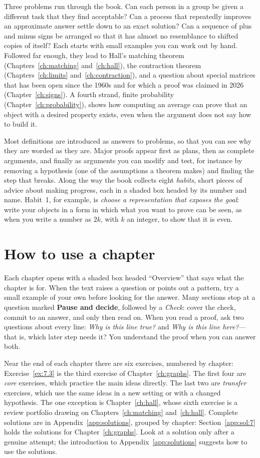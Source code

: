 Three problems run through the book. Can each person in a group be given a different task that they find acceptable? Can a process that repeatedly improves an approximate answer settle down to an exact solution? Can a sequence of plus and minus signs be arranged so that it has almost no resemblance to shifted copies of itself? Each starts with small examples you can work out by hand. Followed far enough, they lead to Hall's matching theorem (Chapters~\ref{ch:matching} and~\ref{ch:hall}), the contraction theorem (Chapters~\ref{ch:limits} and~\ref{ch:contraction}), and a question about special matrices that has been open since the 1960s and for which a proof was claimed in 2026 (Chapter~\ref{ch:signs}). A fourth strand, finite probability (Chapter~\ref{ch:probability}), shows how computing an average can prove that an object with a desired property exists, even when the argument does not say how to build it.

Most definitions are introduced as answers to problems, so that you can see why they are worded as they are. Major proofs appear first as plans, then as complete arguments, and finally as arguments you can modify and test, for instance by removing a hypothesis (one of the assumptions a theorem makes) and finding the step that breaks. Along the way the book collects eight \emph{habits}, short pieces of advice about making progress, each in a shaded box headed by its number and name. Habit~1, for example, is \emph{choose a representation that exposes the goal}: write your objects in a form in which what you want to prove can be seen, as when you write a number as $2k$, with $k$ an integer, to show that it is even.

\section*{How to use a chapter}
Each chapter opens with a shaded box headed ``Overview'' that says what the chapter is for. When the text raises a question or points out a pattern, try a small example of your own before looking for the answer. Many sections stop at a question marked \textbf{Pause and decide}, followed by a \textit{Check}: cover the check, commit to an answer, and only then read on. When you read a proof, ask two questions about every line: \emph{Why is this line true?} and \emph{Why is this line here?}---that is, which later step needs it? You understand the proof when you can answer both.

Near the end of each chapter there are six exercises, numbered by chapter: Exercise~\ref{ex:7.3} is the third exercise of Chapter~\ref{ch:graphs}. The first four are \emph{core} exercises, which practice the main ideas directly. The last two are \emph{transfer} exercises, which use the same ideas in a new setting or with a changed hypothesis. The one exception is Chapter~\ref{ch:hall}, whose sixth exercise is a review portfolio drawing on Chapters~\ref{ch:matching} and~\ref{ch:hall}. Complete solutions are in Appendix~\ref{app:solutions}, grouped by chapter: Section~\ref{app:sol:7} holds the solutions for Chapter~\ref{ch:graphs}. Look at a solution only after a genuine attempt; the introduction to Appendix~\ref{app:solutions} suggests how to use the solutions.

